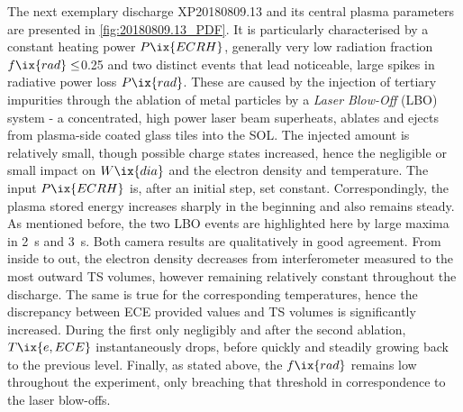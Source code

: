             The next exemplary discharge XP20180809.13 and its central plasma parameters are presented in \cref{fig:20180809.13_PDF}. It is particularly characterised by a constant heating power $P\ix{ECRH}$, generally very low radiation fraction $f\ix{rad}\le$\SI{0.25}{\arbitraryunit} and two distinct events that lead noticeable, large spikes in radiative power loss $P\ix{rad}$. These are caused by the injection of tertiary impurities through the ablation of metal particles by a \textit{Laser Blow-Off} (LBO) system - a concentrated, high power laser beam superheats, ablates and ejects from plasma-side coated glass tiles into the SOL. The injected amount is relatively small, though possible charge states increased, hence the negligible or small impact on $W\ix{dia}$ and the electron density and temperature. The input $P\ix{ECRH}$ is, after an initial step, set constant. Correspondingly, the plasma stored energy increases sharply in the beginning and also remains steady. As mentioned before, the two LBO events are highlighted here by large maxima in \SI{2}{\second} and \SI{3}{\second}. Both camera results are qualitatively in good agreement. From inside to out, the electron density decreases from interferometer measured to the most outward TS volumes, however remaining relatively constant throughout the discharge. The same is true for the corresponding temperatures, hence the discrepancy between ECE provided values and TS volumes is significantly increased. During the first only negligibly and after the second ablation, $T\ix{e,ECE}$ instantaneously drops, before quickly and steadily growing back to the previous level. Finally, as stated above, the $f\ix{rad}$ remains low throughout the experiment, only breaching that threshold in correspondence to the laser blow-offs.\\%
%
